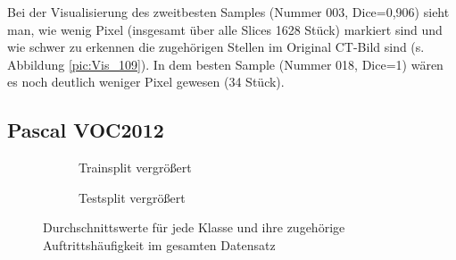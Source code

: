 Bei der Visualisierung des zweitbesten Samples (Nummer 003, Dice=0,906) sieht man, wie wenig Pixel (insgesamt über alle Slices 1628 Stück) markiert sind und wie schwer zu erkennen die zugehörigen Stellen im Original CT-Bild sind (s. Abbildung \ref{pic:Vis_109}). In dem besten Sample (Nummer 018, Dice=1) wären es noch deutlich weniger Pixel gewesen (34 Stück).

\subsection{Pascal VOC2012}
\begin{figure}[H]

%


\begin{subfigure}{\textwidth}

\caption{Trainsplit vergrößert}
\label{pic:Haeuf-Train_204-zoom}
\end{subfigure}



%


\begin{subfigure}{\textwidth}

\caption{Testsplit vergrößert}
\label{pic:Haeuf-Test_204-zoom}
\end{subfigure}
\caption{Durchschnittswerte für jede Klasse und ihre zugehörige Auftrittshäufigkeit im gesamten Datensatz}
\label{pic:Haeuf_204}
\end{figure}


